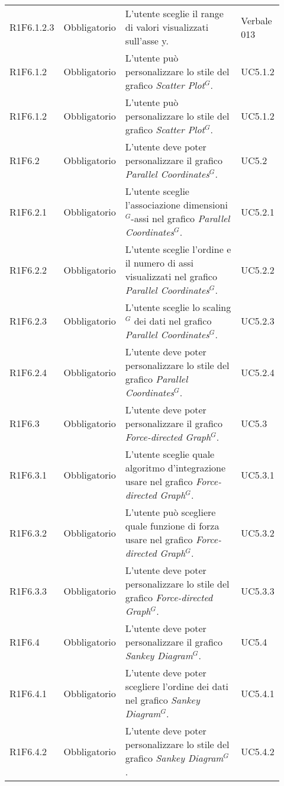 {\begin{longtable}{p{0.12\linewidth}p{0.15\linewidth}p{0.50\linewidth}p{0.15\linewidth}}
    \rowcolor[RGB]{216, 235, 171}
    R1F6.1.2.3 & Obbligatorio & L'utente sceglie il range di valori visualizzati sull'asse y. & Verbale 013 \\
    \rowcolor[RGB]{233, 245, 206}
    R1F6.1.2 & Obbligatorio & L'utente può personalizzare lo stile del grafico \textit{Scatter Plot$^{G}$}. & UC5.1.2\\
    \rowcolor[RGB]{216, 235, 171}
    R1F6.1.2 & Obbligatorio & L'utente può personalizzare lo stile del grafico \textit{Scatter Plot$^{G}$}. & UC5.1.2\\
    \rowcolor[RGB]{233, 245, 206}
    R1F6.2 & Obbligatorio & L'utente deve poter personalizzare il grafico \textit{Parallel Coordinates$^{G}$}. & UC5.2\\
    \rowcolor[RGB]{216, 235, 171}
    R1F6.2.1 & Obbligatorio & L'utente sceglie l'associazione dimensioni$^{G}$-assi nel grafico \textit{Parallel Coordinates$^{G}$}. & UC5.2.1\\
    \rowcolor[RGB]{233, 245, 206}
    R1F6.2.2 & Obbligatorio & L'utente sceglie l'ordine e il numero di assi visualizzati nel grafico \textit{Parallel Coordinates$^{G}$}. & UC5.2.2\\
    \rowcolor[RGB]{216, 235, 171}
    R1F6.2.3 & Obbligatorio & L'utente sceglie lo scaling$^{G}$ dei dati nel grafico \textit{Parallel Coordinates$^{G}$}. & UC5.2.3\\
    \rowcolor[RGB]{233, 245, 206}
    R1F6.2.4 & Obbligatorio & L'utente deve poter personalizzare lo stile del grafico \textit{Parallel Coordinates$^{G}$}. & UC5.2.4\\
    \rowcolor[RGB]{216, 235, 171}
    R1F6.3 & Obbligatorio & L'utente deve poter personalizzare il grafico \textit{Force-directed Graph$^{G}$}. & UC5.3\\
    \rowcolor[RGB]{233, 245, 206}
    R1F6.3.1 & Obbligatorio & L'utente sceglie quale algoritmo d'integrazione usare nel grafico \textit{Force-directed Graph$^{G}$}. & UC5.3.1\\
    \rowcolor[RGB]{216, 235, 171}
    R1F6.3.2 & Obbligatorio & L'utente può scegliere quale funzione di forza usare nel grafico \textit{Force-directed Graph$^{G}$}. & UC5.3.2\\
    \rowcolor[RGB]{233, 245, 206}
    R1F6.3.3 & Obbligatorio & L'utente deve poter personalizzare lo stile del grafico \textit{Force-directed Graph$^{G}$}. & UC5.3.3\\
    \rowcolor[RGB]{216, 235, 171}
    R1F6.4 & Obbligatorio & L'utente deve poter personalizzare il grafico \textit{Sankey Diagram$^{G}$}. & UC5.4\\
    \rowcolor[RGB]{233, 245, 206}
    R1F6.4.1 & Obbligatorio & L'utente deve poter scegliere l'ordine dei dati nel grafico \textit{Sankey Diagram$^{G}$}. & UC5.4.1\\
    \rowcolor[RGB]{216, 235, 171}
    R1F6.4.2 & Obbligatorio & L'utente deve poter personalizzare lo stile del grafico \textit{Sankey Diagram$^{G}$}. & UC5.4.2\\


\end{longtable}}

